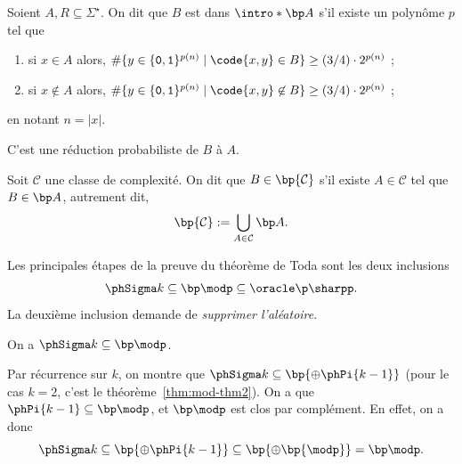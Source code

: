 \documentclass[./main]{subfiles}
\begin{document}
  \begin{defn}
    Soient $A, R \subseteq \Sigma^\star$.
    On dit que $B$ est dans $\intro*\bp A$ s'il existe un polynôme $p$ tel que 
    \begin{enumerate}
      \item si $x \in A$ alors, $\# \{y \in \{\texttt{0},\texttt{1}\}^{p(n)}  \mid \code{x,y} \in B \} \ge (3/4)\cdot 2^{p(n)}$ ;
      \item si $x \not\in A$ alors, $\# \{y \in \{\texttt{0},\texttt{1}\}^{p(n)}  \mid \code{x,y} \not\in B \} \ge (3/4)\cdot  2^{p(n)}$ ;
    \end{enumerate}
    en notant $n = |x|$.
    
    C'est une réduction probabiliste de $B$ à $A$.

    Soit $\mathcal{C}$ une classe de complexité.
    On dit que $B \in \bp{\mathcal{C}}$ s'il existe $A \in \mathcal{C}$ tel que $B \in \bp A$, autrement dit, 
    \[
      \bp{\mathcal{C}} := \bigcup_{A \in \mathcal{C}}  \bp A
    .\]
  \end{defn}

  \begin{rmk}
    Les principales étapes de la preuve du théorème de Toda sont les deux inclusions
    \[
      \phSigma k \subseteq \bp\modp \subseteq \oracle \p \sharpp
    .\]
    La deuxième inclusion demande de \textit{supprimer l'aléatoire}.
  \end{rmk}

  \begin{prop}
    On a $\phSigma k \subseteq \bp\modp$.
  \end{prop}
  \begin{prv}
    Par récurrence sur $k$, on montre que $\phSigma k \subseteq \bp{{\oplus \phPi {k-1}}}$ (pour le cas $k = 2$, c'est le théorème~\ref{thm:mod-thm2}).
    On a que $\phPi{k-1} \subseteq \bp \modp$, et $\bp\modp$ est clos par complément.
    En effet, on a donc
    \[
      \phSigma k \subseteq \bp {{\oplus \phPi {k-1}}} \subseteq \bp{{\oplus \bp{\modp}}} = \bp\modp
    .\]
  \end{prv}
\end{document}

